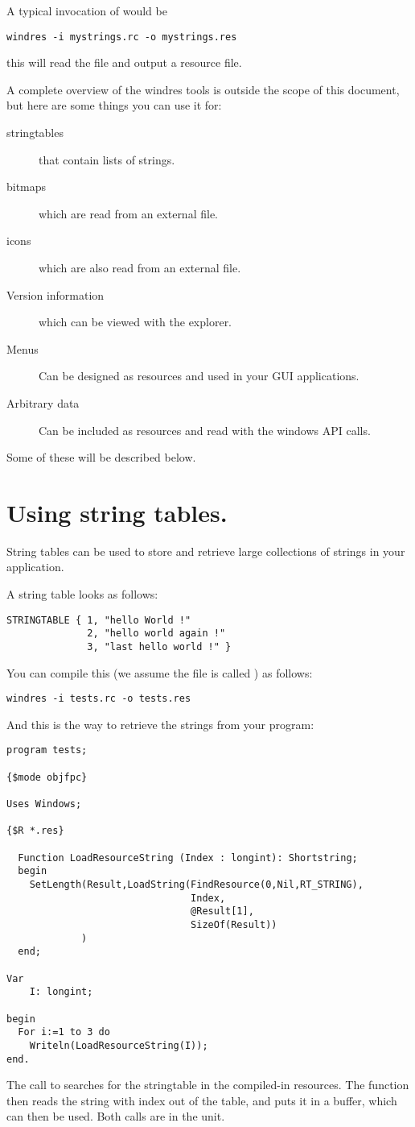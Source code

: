 A typical invocation of  would be
\begin{verbatim}
windres -i mystrings.rc -o mystrings.res
\end{verbatim}
this will read the  file and output a
 resource file.

A complete overview of the windres tools is outside the scope of this
document, but here are some things you can use it for:
\begin{description}
\item[stringtables] that contain lists of strings.
\item[bitmaps] which are read from an external file.
\item[icons] which are also read from an external file.
\item[Version information] which can be viewed with the \windows
explorer.
\item[Menus] Can be designed as resources and used in your GUI
applications.
\item[Arbitrary data] Can be included as resources and read with the
windows API calls.
\end{description}

Some of these will be described below.
\section{Using string tables.}
String tables can be used to store and retrieve large collections of
strings in your application.

A string table looks as follows:
\begin{verbatim}
STRINGTABLE { 1, "hello World !"
              2, "hello world again !"
              3, "last hello world !" }
\end{verbatim}
You can compile this (we assume the file is called ) as
follows:
\begin{verbatim}
windres -i tests.rc -o tests.res
\end{verbatim}
And this is the way to retrieve the strings from your program:
\begin{verbatim}
program tests;

{$mode objfpc}

Uses Windows;

{$R *.res}

  Function LoadResourceString (Index : longint): Shortstring;
  begin
    SetLength(Result,LoadString(FindResource(0,Nil,RT_STRING),
                                Index,
                                @Result[1],
                                SizeOf(Result))
             )
  end;

Var
    I: longint;

begin
  For i:=1 to 3 do
    Writeln(LoadResourceString(I));
end.
\end{verbatim}
The call to  searches for the stringtable in the
compiled-in resources. The  function then reads the
string with index  out of the table, and puts it in a buffer,
which can then be used. Both calls are in the  unit.

